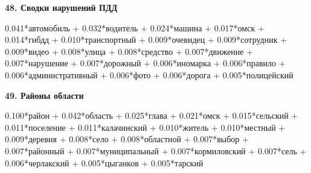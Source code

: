 \textbf{48. Сводки нарушений ПДД}

0.041*автомобиль + 0.032*водитель + 0.024*машина + 0.017*омск + 0.014*гибдд + 0.010*транспортный + 0.009*очевидец + 0.009*сотрудник + 0.009*видео + 0.008*улица + 0.008*средство + 0.007*движение + 0.007*нарушение + 0.007*дорожный + 0.006*иномарка + 0.006*правило + 0.006*административный + 0.006*фото + 0.006*дорога + 0.005*полицейский

\textbf{49. Районы области}

0.100*район + 0.042*область + 0.025*глава + 0.021*омск + 0.015*сельский + 0.011*поселение + 0.011*калачинский + 0.010*житель + 0.010*местный + 0.009*деревня + 0.008*село + 0.008*областной + 0.007*выбор + 0.007*районный + 0.007*муниципальный + 0.007*кормиловский + 0.007*сель + 0.006*черлакский + 0.005*цыганков + 0.005*тарский

